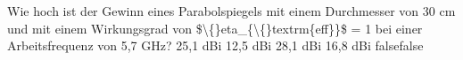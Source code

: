     {Wie hoch ist der Gewinn eines Parabolspiegels mit einem Durchmesser von 30 cm und mit einem Wirkungsgrad von \$\textbackslash\{\}eta\_\{\textbackslash\{\}textrm\{eff\}\}\$ = 1 bei einer Arbeitsfrequenz von 5,7 GHz?}
    {25,1 dBi}
    {12,5 dBi}
    {28,1 dBi}
    {16,8 dBi}
    {false}{false}